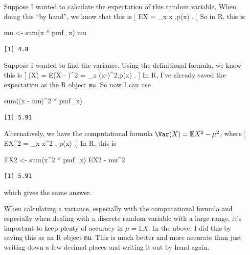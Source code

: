 \documentclass[
  letterpaper,
]{report}
\newenvironment{Shaded}{\begin{snugshade}}{\end{snugshade}}
\newcommand{\DecValTok}[1]{\textcolor[rgb]{0.68,0.00,0.00}{#1}}
\newcommand{\FunctionTok}[1]{\textcolor[rgb]{0.28,0.35,0.67}{#1}}
\newcommand{\NormalTok}[1]{\textcolor[rgb]{0.00,0.23,0.31}{#1}}
\newcommand{\OtherTok}[1]{\textcolor[rgb]{0.00,0.23,0.31}{#1}}
\newcommand{\SpecialCharTok}[1]{\textcolor[rgb]{0.37,0.37,0.37}{#1}}
\theoremstyle{definition}
\theoremstyle{definition}
\theoremstyle{remark}
\begin{document}
Suppose I wanted to calculate the expectation of this random variable.
When doing this ``by hand'', we know that this is {[} \mathbb EX =
\sum\_x x ,p(x) . {]} So in R, this is

\begin{Shaded}
\begin{Highlighting}[]
\NormalTok{mu }\OtherTok{\textless{}{-}} \FunctionTok{sum}\NormalTok{(x }\SpecialCharTok{*}\NormalTok{ pmf\_x)}
\NormalTok{mu}
\end{Highlighting}
\end{Shaded}

\begin{verbatim}
[1] 4.8
\end{verbatim}

Suppose I wanted to find the variance. Using the definitional formula,
we know this is {[} \Var(X) = \mathbb E(X - \mu)\^{}2 = \sum\_x
(x-\mu)\^{}2,p(x) . {]} In R, I've already saved the expectation as the
R object \texttt{mu}. So now I can use

\begin{Shaded}
\begin{Highlighting}[]
\FunctionTok{sum}\NormalTok{((x }\SpecialCharTok{{-}}\NormalTok{ mu)}\SpecialCharTok{\^{}}\DecValTok{2} \SpecialCharTok{*}\NormalTok{ pmf\_x)}
\end{Highlighting}
\end{Shaded}

\begin{verbatim}
[1] 5.91
\end{verbatim}

Alternatively, we have the computational formula
\(\Var(X) = \mathbb EX^2 - \mu^2\), where {[} \mathbb EX\^{}2 = \sum\_x
x\^{}2 , p(x) .{]} In R, this is

\begin{Shaded}
\begin{Highlighting}[]
\NormalTok{EX2 }\OtherTok{\textless{}{-}} \FunctionTok{sum}\NormalTok{(x}\SpecialCharTok{\^{}}\DecValTok{2} \SpecialCharTok{*}\NormalTok{ pmf\_x)}
\NormalTok{EX2 }\SpecialCharTok{{-}}\NormalTok{ mu}\SpecialCharTok{\^{}}\DecValTok{2}
\end{Highlighting}
\end{Shaded}

\begin{verbatim}
[1] 5.91
\end{verbatim}

which gives the same answer.

When calculating a variance, especially with the computational formula
and especially when dealing with a discrete random variable with a large
range, it's important to keep plenty of accuracy in
\(\mu = \mathbb EX\). In the above, I did this by saving this as an R
object \texttt{mu}. This is much better and more accurate than just
writing down a few decimal places and writing it out by hand again.
\end{document}
